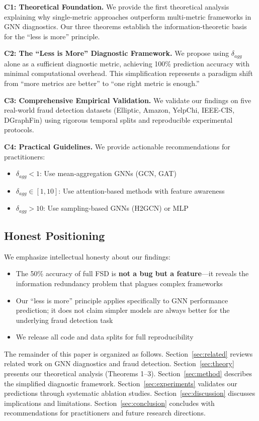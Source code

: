 \textbf{C1: Theoretical Foundation.} We provide the first theoretical analysis explaining why single-metric approaches outperform multi-metric frameworks in GNN diagnostics. Our three theorems establish the information-theoretic basis for the ``less is more'' principle.

\textbf{C2: The ``Less is More'' Diagnostic Framework.} We propose using $\delta_{agg}$ alone as a sufficient diagnostic metric, achieving 100\% prediction accuracy with minimal computational overhead. This simplification represents a paradigm shift from ``more metrics are better'' to ``one right metric is enough.''

\textbf{C3: Comprehensive Empirical Validation.} We validate our findings on five real-world fraud detection datasets (Elliptic, Amazon, YelpChi, IEEE-CIS, DGraphFin) using rigorous temporal splits and reproducible experimental protocols.

\textbf{C4: Practical Guidelines.} We provide actionable recommendations for practitioners:
\begin{itemize}
    \item $\delta_{agg} < 1$: Use mean-aggregation GNNs (GCN, GAT)
    \item $\delta_{agg} \in [1, 10]$: Use attention-based methods with feature awareness
    \item $\delta_{agg} > 10$: Use sampling-based GNNs (H2GCN) or MLP
\end{itemize}

\subsection{Honest Positioning}

We emphasize intellectual honesty about our findings:

\begin{itemize}
    \item The 50\% accuracy of full FSD is \textbf{not a bug but a feature}---it reveals the information redundancy problem that plagues complex frameworks
    \item Our ``less is more'' principle applies specifically to GNN performance prediction; it does not claim simpler models are always better for the underlying fraud detection task
    \item We release all code and data splits for full reproducibility
\end{itemize}

The remainder of this paper is organized as follows. Section~\ref{sec:related} reviews related work on GNN diagnostics and fraud detection. Section~\ref{sec:theory} presents our theoretical analysis (Theorems 1--3). Section~\ref{sec:method} describes the simplified diagnostic framework. Section~\ref{sec:experiments} validates our predictions through systematic ablation studies. Section~\ref{sec:discussion} discusses implications and limitations. Section~\ref{sec:conclusion} concludes with recommendations for practitioners and future research directions.
